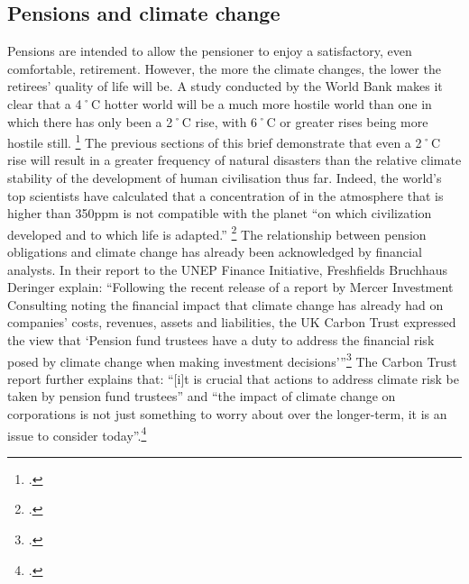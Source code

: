 \subsection {Pensions and climate change}



Pensions are intended to allow the pensioner to enjoy a satisfactory, even comfortable, retirement.
However, the more the climate changes, the lower the retirees' quality of life will be.
A study conducted by the World Bank makes it clear that a 4˚C hotter world will be a much more hostile world than one in which there has only been a 2˚C rise, with 6˚C or greater rises being more hostile still. \footcite{WorldBank4C}
The previous sections of this brief demonstrate that even a 2˚C rise will result in a greater frequency of natural disasters than the relative climate stability of the development of human civilisation thus far.
Indeed, the world's top scientists have calculated that a concentration of  in the atmosphere that is higher than 350ppm is not compatible with the planet ``on which civilization developed and to which life is adapted.'' \footcite{TargetAtmosphere}
The relationship between pension obligations and climate change has already been acknowledged by financial analysts.
In their report to the UNEP Finance Initiative, Freshfields Bruchhaus Deringer explain: ``Following the recent release of a report by Mercer Investment Consulting noting the financial impact that climate change has already had on companies' costs, revenues, assets and liabilities, the UK Carbon Trust expressed the view that `Pension fund trustees have a duty to address the financial risk posed by climate change when making investment decisions'''\footcite[][p. 11]{UNEPFinanceInit}
The Carbon Trust report further explains that: ``[i]t is crucial that actions to address climate risk be taken by pension fund trustees'' and ``the impact of climate change on corporations is not just something to worry about over the longer-term, it is an issue to consider today''.\footcite[][p. 2, 10]{TrusteesGuide}



